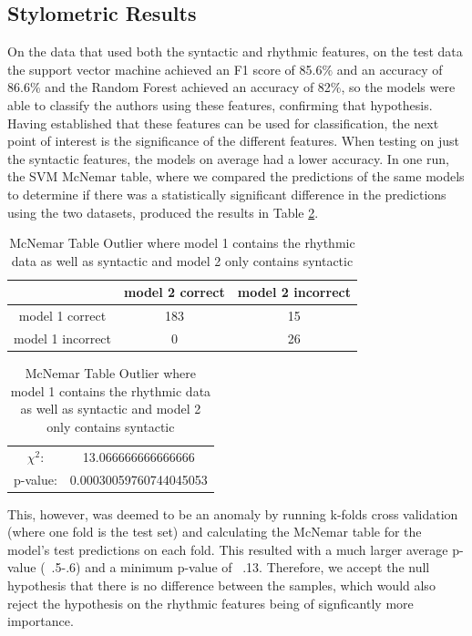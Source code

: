 \documentclass{csfourzero}
\begin{document}
\subsection{Stylometric Results}
On the data that used both the syntactic and rhythmic features, on the test data the support vector machine achieved an F1 score of 85.6$\%$ and an accuracy of 86.6$\%$ and the Random Forest achieved an accuracy of 82$\%$, so the models were able to classify the authors using these features, confirming that hypothesis. Having established that these features can be used for classification, the next point of interest is the significance of the different features. When testing on just the syntactic features, the models on average had a lower accuracy. In one run, the SVM McNemar table, where we compared the predictions of the same models to determine if there was a statistically significant difference in the predictions using the two datasets, produced the results in Table \ref{tab:McNemarOutlier}.
\begin{center}
\begin{table}[hbt!]
    \centering
    \begin{tabular}{c|c | c}
     & model 2 correct & model 2 incorrect \\ \hline
     model 1 correct & 183 & 15 \\ \hline
    model 1 incorrect & 0 & 26 \\
    \end{tabular} 
    \begin{tabular}{c c}
     $\chi^{2}$: & 13.066666666666666 \\ 
     p-value: & 0.00030059760744045053
    \end{tabular}
    \newline
    
    
    \caption{McNemar Table Outlier where model 1 contains the rhythmic data as well as syntactic and model 2 only contains syntactic}
    \label{tab:McNemarOutlier}
\end{table}

\end{center}
This, however, was deemed to be an anomaly by running k-folds cross validation (where one fold is the test set) and calculating the McNemar table for the model’s test predictions on each fold. This resulted with a much larger average p-value (~.5-.6) and a minimum p-value of ~.13. Therefore, we accept the null hypothesis that there is no difference between the samples, which would also reject the hypothesis on the rhythmic features being of signficantly more importance.
\end{document}
